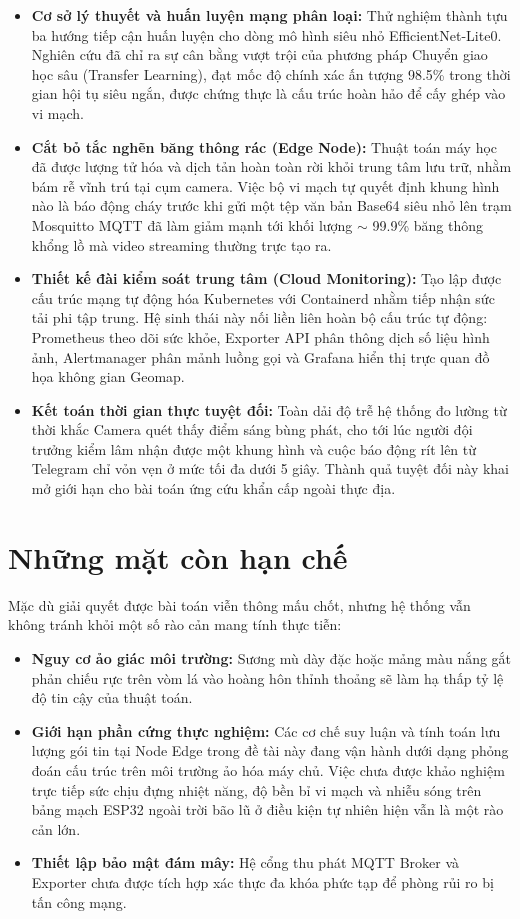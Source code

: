 \documentclass[12pt,a4paper]{report}
\begin{document}
\begin{itemize}
    \item \textbf{Cơ sở lý thuyết và huấn luyện mạng phân loại:} Thử nghiệm thành tựu ba hướng tiếp cận huấn luyện cho dòng mô hình siêu nhỏ EfficientNet-Lite0. Nghiên cứu đã chỉ ra sự cân bằng vượt trội của phương pháp Chuyển giao học sâu (Transfer Learning), đạt mốc độ chính xác ấn tượng 98.5\% trong thời gian hội tụ siêu ngắn, được chứng thực là cấu trúc hoàn hảo để cấy ghép vào vi mạch.
    \item \textbf{Cắt bỏ tắc nghẽn băng thông rác (Edge Node):} Thuật toán máy học đã được lượng tử hóa và dịch tản hoàn toàn rời khỏi trung tâm lưu trữ, nhằm bám rễ vĩnh trú tại cụm camera. Việc bộ vi mạch tự quyết định khung hình nào là báo động cháy trước khi gửi một tệp văn bản Base64 siêu nhỏ lên trạm Mosquitto MQTT đã làm giảm mạnh tới khối lượng $\sim$ 99.9\% băng thông khổng lồ mà video streaming thường trực tạo ra.
    \item \textbf{Thiết kế đài kiểm soát trung tâm (Cloud Monitoring):} Tạo lập được cấu trúc mạng tự động hóa Kubernetes với Containerd nhằm tiếp nhận sức tải phi tập trung. Hệ sinh thái này nối liền liên hoàn bộ cấu trúc tự động: Prometheus theo dõi sức khỏe, Exporter API phân thông dịch số liệu hình ảnh, Alertmanager phân mảnh luồng gọi và Grafana hiển thị trực quan đồ họa không gian Geomap.
    \item \textbf{Kết toán thời gian thực tuyệt đối:} Toàn dải độ trễ hệ thống đo lường từ thời khắc Camera quét thấy điểm sáng bùng phát, cho tới lúc người đội trưởng kiểm lâm nhận được một khung hình và cuộc báo động rít lên từ Telegram chỉ vỏn vẹn ở mức tối đa dưới 5 giây. Thành quả tuyệt đối này khai mở giới hạn cho bài toán ứng cứu khẩn cấp ngoài thực địa.
\end{itemize}

\section{Những mặt còn hạn chế}

Mặc dù giải quyết được bài toán viễn thông mấu chốt, nhưng hệ thống vẫn không tránh khỏi một số rào cản mang tính thực tiễn:
\begin{itemize}
    \item \textbf{Nguy cơ ảo giác môi trường:} Sương mù dày đặc hoặc mảng màu nắng gắt phản chiếu rực trên vòm lá vào hoàng hôn thỉnh thoảng sẽ làm hạ thấp tỷ lệ độ tin cậy của thuật toán.
    \item \textbf{Giới hạn phần cứng thực nghiệm:} Các cơ chế suy luận và tính toán lưu lượng gói tin tại Node Edge trong đề tài này đang vận hành dưới dạng phỏng đoán cấu trúc trên môi trường ảo hóa máy chủ. Việc chưa được khảo nghiệm trực tiếp sức chịu đựng nhiệt năng, độ bền bỉ vi mạch và nhiễu sóng trên bảng mạch ESP32 ngoài trời bão lũ ở điều kiện tự nhiên hiện vẫn là một rào cản lớn.
    \item \textbf{Thiết lập bảo mật đám mây:} Hệ cổng thu phát MQTT Broker và Exporter chưa được tích hợp xác thực đa khóa phức tạp để phòng rủi ro bị tấn công mạng.
\end{itemize}
\end{document}
